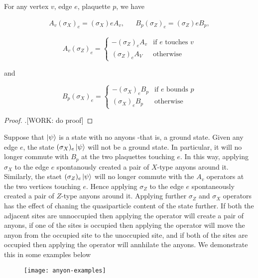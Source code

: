 \begin{lemma} For any vertex $v$, edge $e$, plaquette $p$, we have

\begin{align*}
A_v  (\sigma_X)_e=(\sigma_X)e A_v, && B_p (\sigma_Z)_e=(\sigma_Z)e B_p,
\end{align*}

\begin{equation*}
A_v (\sigma_Z)_e=
\begin{cases}
- (\sigma_Z)_e A_v & \text{if $e$ touches $v$}\\
(\sigma_Z)_e A_V & \text{otherwise}
\end{cases}
\end{equation*}

and

\begin{equation*}
B_p (\sigma_X)_e=
\begin{cases}
- (\sigma_X)_e B_p & \text{if $e$ bounds $p$}\\
(\sigma_X)_e B_p & \text{otherwise}
\end{cases}
\end{equation*}


\end{lemma}
\begin{proof}.[WORK: do proof]
\end{proof}

Suppose that $\ket{\psi}$ is a state with no anyons -that is, a ground state. Given any edge $e$, the state $(\sigma_X)_e \ket{\psi}$ will not be a ground state. In particular, it will no longer commute with $B_p$ at the two plaquettes touching $e$. In this way, applying $\sigma_X$ to the edge $e$ spontanously created a pair of $X$-type anyons around it. Similarly, the staet $(\sigma_Z)_e\ket{\psi}$ will no longer commute with the $A_v$ operators at the two vertices touching $e$. Hence applying $\sigma_Z$ to the edge $e$ spontaneously created a pair of $Z$-type anyons around it. Applying further $\sigma_Z$ and $\sigma_X$ operators has the effect of chaning the quasiparticle content of the state further. If both the adjacent sites are unnoccupied then applying the operator will create a pair of anyons, if one of the sites is occupied then applying the operator will move the anyon from the occupied site to the unoccupied site, and if both of the sites are occupied then applying the operator will annhilate the anyons. We demonstrate this in some examples below

\begin{figure}[h]
\begin{center}
\texttt{[image: anyon-examples]}
\end{center}
\end{figure}

